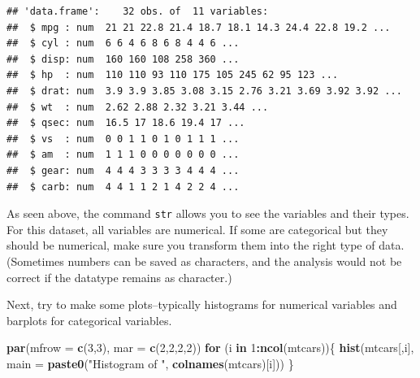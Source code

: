\documentclass[
]{book}
\newenvironment{Shaded}{\begin{snugshade}}{\end{snugshade}}
\newcommand{\AttributeTok}[1]{\textcolor[rgb]{0.13,0.29,0.53}{#1}}
\newcommand{\ControlFlowTok}[1]{\textcolor[rgb]{0.13,0.29,0.53}{\textbf{#1}}}
\newcommand{\DecValTok}[1]{\textcolor[rgb]{0.00,0.00,0.81}{#1}}
\newcommand{\FunctionTok}[1]{\textcolor[rgb]{0.13,0.29,0.53}{\textbf{#1}}}
\newcommand{\NormalTok}[1]{#1}
\newcommand{\SpecialCharTok}[1]{\textcolor[rgb]{0.81,0.36,0.00}{\textbf{#1}}}
\newcommand{\StringTok}[1]{\textcolor[rgb]{0.31,0.60,0.02}{#1}}
\begin{document}
\begin{verbatim}
## 'data.frame':    32 obs. of  11 variables:
##  $ mpg : num  21 21 22.8 21.4 18.7 18.1 14.3 24.4 22.8 19.2 ...
##  $ cyl : num  6 6 4 6 8 6 8 4 4 6 ...
##  $ disp: num  160 160 108 258 360 ...
##  $ hp  : num  110 110 93 110 175 105 245 62 95 123 ...
##  $ drat: num  3.9 3.9 3.85 3.08 3.15 2.76 3.21 3.69 3.92 3.92 ...
##  $ wt  : num  2.62 2.88 2.32 3.21 3.44 ...
##  $ qsec: num  16.5 17 18.6 19.4 17 ...
##  $ vs  : num  0 0 1 1 0 1 0 1 1 1 ...
##  $ am  : num  1 1 1 0 0 0 0 0 0 0 ...
##  $ gear: num  4 4 4 3 3 3 3 4 4 4 ...
##  $ carb: num  4 4 1 1 2 1 4 2 2 4 ...
\end{verbatim}

As seen above, the command \texttt{str} allows you to see the variables and their types. For this dataset, all variables are numerical. If some are categorical but they should be numerical, make sure you transform them into the right type of data. (Sometimes numbers can be saved as characters, and the analysis would not be correct if the datatype remains as character.)

Next, try to make some plots--typically histograms for numerical variables and barplots for categorical variables.

\begin{Shaded}
\begin{Highlighting}[]
\FunctionTok{par}\NormalTok{(}\AttributeTok{mfrow =} \FunctionTok{c}\NormalTok{(}\DecValTok{3}\NormalTok{,}\DecValTok{3}\NormalTok{), }\AttributeTok{mar =} \FunctionTok{c}\NormalTok{(}\DecValTok{2}\NormalTok{,}\DecValTok{2}\NormalTok{,}\DecValTok{2}\NormalTok{,}\DecValTok{2}\NormalTok{))}
\ControlFlowTok{for}\NormalTok{ (i }\ControlFlowTok{in} \DecValTok{1}\SpecialCharTok{:}\FunctionTok{ncol}\NormalTok{(mtcars))\{}
  \FunctionTok{hist}\NormalTok{(mtcars[,i], }\AttributeTok{main =} \FunctionTok{paste0}\NormalTok{(}\StringTok{"Histogram of "}\NormalTok{, }\FunctionTok{colnames}\NormalTok{(mtcars)[i]))}
\NormalTok{\}}
\end{Highlighting}
\end{Shaded}
\end{document}
